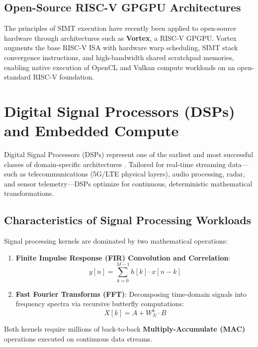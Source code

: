 \subsection{Open-Source RISC-V GPGPU Architectures}
The principles of SIMT execution have recently been applied to open-source hardware through architectures such as \textbf{Vortex}, a RISC-V GPGPU. Vortex augments the base RISC-V ISA with hardware warp scheduling, SIMT stack convergence instructions, and high-bandwidth shared scratchpad memories, enabling native execution of OpenCL and Vulkan compute workloads on an open-standard RISC-V foundation.


\section{Digital Signal Processors (DSPs) and Embedded Compute}\label{sec:dsp_architecture}

Digital Signal Processors (DSPs) represent one of the earliest and most successful classes of domain-specific architectures \cite{eyre2000evolution}. Tailored for real-time streaming data—such as telecommunications (5G/LTE physical layers), audio processing, radar, and sensor telemetry—DSPs optimize for continuous, deterministic mathematical transformations.

\subsection{Characteristics of Signal Processing Workloads}
Signal processing kernels are dominated by two mathematical operations:
\begin{enumerate}
    \item \textbf{Finite Impulse Response (FIR) Convolution and Correlation}:
    \begin{equation}
    y[n] = \sum_{k=0}^{M-1} h[k] \cdot x[n-k]
    \end{equation}
    \item \textbf{Fast Fourier Transforms (FFT)}: Decomposing time-domain signals into frequency spectra via recursive butterfly computations:
    \begin{equation}
    X[k] = A + W_N^k \cdot B
    \end{equation}
\end{enumerate}
Both kernels require millions of back-to-back \textbf{Multiply-Accumulate (MAC)} operations executed on continuous data streams.


